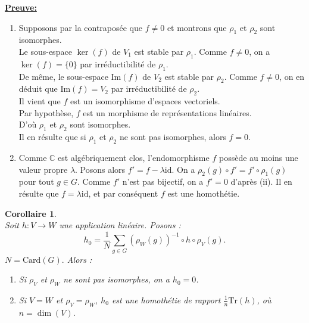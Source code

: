 \documentclass[a4paper, 14pt]{report}
\newtheorem{corollary}{Corollaire}[section]
\begin{document}
\begin{onehalfspace}
{			
			\textbf{\underline{Preuve:}}
			\begin{enumerate} [label=\roman*)]
				\item Supposons par la contraposée que \( f \neq 0 \) et montrons que \( \rho_1 \) et \( \rho_2 \) sont isomorphes.\\
				Le sous-espace \( \ker(f) \) de \( V_1 \) est stable par \( \rho_1 \). Comme \( f \neq 0 \), on a \( \ker(f) = \{0\} \) par irréductibilité de \( \rho_1 \).\\
				De même, le sous-espace \( \mathrm{Im}(f) \) de \( V_2 \) est stable par \( \rho_2 \). Comme \( f \neq 0 \), on en déduit que \( \mathrm{Im}(f) = V_2 \) par irréductibilité de \( \rho_2 \).\\
				Il vient que \( f \) est un isomorphisme d'espaces vectoriels.\\
				Par hypothèse, \( f \) est un morphisme de représentations linéaires. \\
				D'où \( \rho_1 \) et \( \rho_2 \) sont isomorphes. \\
				Il en résulte que si \( \rho_1 \) et \( \rho_2 \) ne sont pas isomorphes, alors \( f = 0 \).	
				\item Comme \( \mathbb{C} \) est algébriquement clos, l’endomorphisme \( f \) possède au moins une valeur propre \( \lambda \). Posons alors \( f' = f - \lambda \mathrm{id} \). On a \( \rho_2(g) \circ f' = f' \circ \rho_1(g) \) pour tout \( g \in G \). Comme \( f' \) n’est pas bijectif, on a \( f' = 0 \) d'après (ii). Il en résulte que \( f = \lambda \mathrm{id} \), et par conséquent \( f \) est une homothétie.
			\end{enumerate}
			
			
			\begin{corollary} \cite{serre1971representation}\\
				Soit \( h  : V \to W \) une application linéaire. Posons :
				\[
				h_0 = \frac{1}{N} \sum_{g \in G} (\rho_W(g))^{-1} \circ h \circ \rho_V(g).
				\]
				\( N = \mathrm{Card}(G) .\)
				Alors :
				\begin{enumerate}[label=\roman*)]
					\item Si \( \rho_V \) et \( \rho_W \) ne sont pas isomorphes, on a \( h_0 = 0 \).
					\item Si \( V = W \) et \( \rho_V = \rho_W \), \( h_0 \) est une homothétie de rapport \( \frac{1}{n} \text{Tr}(h)  \), où \( n = \dim(V) \).
				\end{enumerate}
			\end{corollary}
			
}
\end{onehalfspace}
\end{document}
